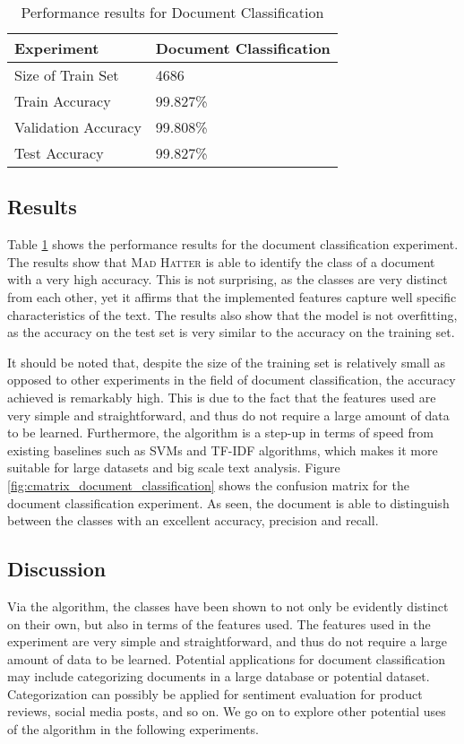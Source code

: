 \begin{table}[htbp]
    \centering
    \caption{Performance results for Document Classification}
    \label{tab:document_classification}
    \begin{tabular}{ll}
    \toprule
    Experiment & Document Classification \\
    \midrule
    Size of Train Set & 4686 \\
    Train Accuracy & 99.827\% \\
    Validation Accuracy & 99.808\% \\
    Test Accuracy & 99.827\% \\
    \bottomrule
    \end{tabular}
    \end{table}

\subsection*{Results}
Table \ref{tab:document_classification} shows the performance results for the document classification experiment. The results show that \textsc{Mad Hatter} is able to identify the class of a document with a very high accuracy. This is not surprising, as the classes are very distinct from each other, yet it affirms that the implemented features capture well specific characteristics of the text. The results also show that the model is not overfitting, as the accuracy on the test set is very similar to the accuracy on the training set.

It should be noted that, despite the size of the training set is relatively small as opposed to other experiments in the field of document classification, the accuracy achieved is remarkably high. This is due to the fact that the features used are very simple and straightforward, and thus do not require a large amount of data to be learned. Furthermore, the algorithm is a step-up in terms of speed from existing baselines such as SVMs and TF-IDF algorithms, which makes it more suitable for large datasets and big scale text analysis. Figure \ref{fig:cmatrix_document_classification} shows the confusion matrix for the document classification experiment. As seen, the document is able to distinguish between the classes with an excellent accuracy, precision and recall.

\subsection*{Discussion}
Via the algorithm, the classes have been shown to not only be evidently distinct on their own, but also in terms of the features used. The features used in the experiment are very simple and straightforward, and thus do not require a large amount of data to be learned. Potential applications for document classification may include categorizing documents in a large database or potential dataset. Categorization can possibly be applied for sentiment evaluation for product reviews, social media posts, and so on. We go on to explore other potential uses of the algorithm in the following experiments.

